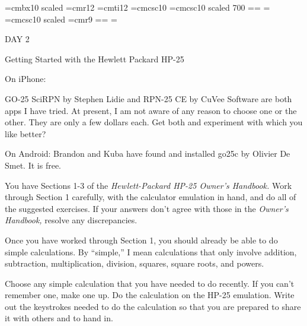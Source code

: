 
\def\folio{\ifnum\pageno>0 \number\pageno \else
   \ifnum\pageno<0 \romannumeral-\pageno \else\fi\fi}

\font\largebf=cmbx10  scaled 
\font\largerm=cmr12
\font\largeit=cmti12
\font\tensc=cmcsc10
\font\sevensc=cmcsc10 scaled 700
\newfam\scfam \def\sc{\fam\scfam\tensc}
\textfont\scfam=\tensc \scriptfont\scfam=\sevensc
\scriptscriptfont\scfam=\sevensc
\font\largesc=cmcsc10 scaled 
\font\ninerm=cmr9
\newfam\srfam \def\sr{\fam\srfam\ninerm}
\textfont\srfam=\ninerm \scriptfont\srfam=\sevenrm
\scriptscriptfont\srfam=\fiverm




\null\vskip36pt

\centerline{\largerm DAY 2}
\nobreak\bigskip

\centerline{\largeit Getting Started with the Hewlett Packard HP-25}
\nobreak\bigskip

\nobreak\bigskip

\noindent On iPhone:
\nobreak\bigskip

\noindent GO-25 SciRPN by Stephen Lidie and RPN-25 CE  by CuVee Software are both apps I have tried. At present, I am not aware of any reason to choose one or the other. They are only a few dollars each. Get both and experiment with which you like better?
\bigskip

\noindent On Android:
\nobreak\bigskip
\noindent Brandon and Kuba have found and installed go25c by Olivier De Smet. It is free.
\bigskip

\nobreak\bigskip

\noindent You have Sections 1-3 of the {\it Hewlett-Packard HP-25 Owner's Handbook.} Work through Section 1 carefully, with the calculator emulation in hand, and do all of the suggested exercises. If your answers don't agree with those in the {\it Owner's Handbook,} resolve any discrepancies.
\bigskip

\nobreak\bigskip

\noindent Once you have worked through Section 1, you should already be able to do simple calculations. By ``simple,'' I mean calculations that only involve addition, subtraction, multiplication, division, squares, square roots, and powers.

Choose any simple calculation that you have needed to do recently. If you can't remember one, make one up. Do the calculation on the HP-25 emulation. Write out the keystrokes needed to do the calculation so that you are prepared to share it with others and to hand in.


